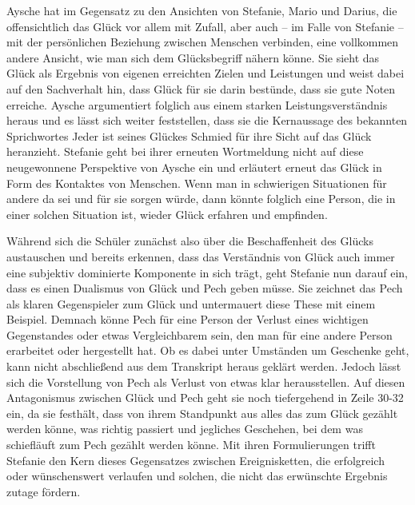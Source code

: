 Aysche hat im Gegensatz zu den Ansichten von Stefanie, Mario und Darius, die offensichtlich das Glück vor allem mit Zufall, aber auch -- im Falle von Stefanie -- mit der persönlichen Beziehung zwischen Menschen verbinden, eine vollkommen andere Ansicht, wie man sich dem Glücksbegriff nähern könne. 
Sie sieht das Glück als Ergebnis von eigenen erreichten Zielen und Leistungen und weist dabei auf den Sachverhalt hin, dass Glück für sie darin bestünde, dass sie gute Noten erreiche. 
Aysche argumentiert folglich aus einem starken Leistungsverständnis heraus und es lässt sich weiter feststellen, dass sie die Kernaussage des bekannten Sprichwortes \glqq Jeder ist seines Glückes Schmied\grqq{} für ihre Sicht auf das Glück heranzieht. 
Stefanie geht bei ihrer erneuten Wortmeldung nicht auf diese neugewonnene Perspektive von Aysche ein und erläutert erneut das Glück in Form des Kontaktes von Menschen. 
Wenn man in schwierigen Situationen für andere da sei und für sie sorgen würde, dann könnte folglich eine Person, die in einer solchen Situation ist, wieder Glück erfahren und empfinden. 

Während sich die Schüler zunächst also über die Beschaffenheit des Glücks austauschen und bereits erkennen, dass das Verständnis von Glück auch immer eine subjektiv dominierte Komponente in sich trägt, geht Stefanie nun darauf ein, dass es einen Dualismus von Glück und Pech geben müsse.
Sie zeichnet das Pech als klaren Gegenspieler zum Glück und untermauert diese These mit einem Beispiel. 
Demnach könne Pech für eine Person der Verlust eines wichtigen Gegenstandes oder etwas Vergleichbarem sein, den man für eine andere Person erarbeitet oder hergestellt hat. 
Ob es dabei unter Umständen um Geschenke geht, kann nicht abschließend aus dem Transkript heraus geklärt werden. 
Jedoch lässt sich die Vorstellung von Pech als Verlust von etwas klar herausstellen. 
Auf diesen Antagonismus zwischen Glück und Pech geht sie noch tiefergehend in Zeile 30-32 ein, da sie festhält, dass von ihrem Standpunkt aus alles das zum Glück gezählt werden könne, was \glqq richtig passiert\grqq{} und jegliches Geschehen, bei dem \glqq was schiefläuft\grqq{} zum Pech gezählt werden könne.
Mit ihren Formulierungen trifft Stefanie den Kern dieses Gegensatzes zwischen Ereignisketten, die erfolgreich oder wünschenswert verlaufen und solchen, die nicht das erwünschte Ergebnis zutage fördern. 

